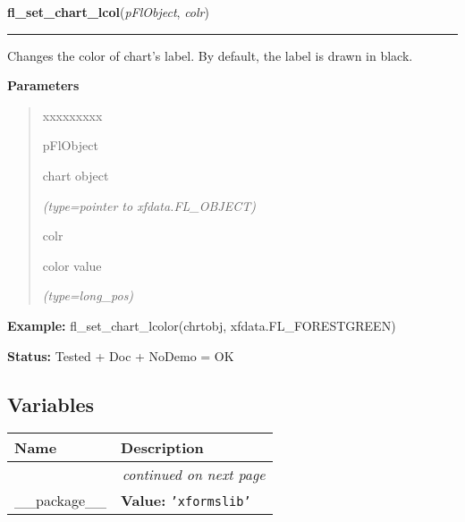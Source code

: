 \hspace{.8\funcindent}\begin{boxedminipage}{\funcwidth}

    \raggedright \textbf{fl\_set\_chart\_lcol}(\textit{pFlObject}, \textit{colr})

    \vspace{-1.5ex}

    \rule{\textwidth}{0.5\fboxrule}
\setlength{\parskip}{2ex}
    Changes the color of chart's label. By default, the label is drawn in 
    black.

\setlength{\parskip}{1ex}
      \textbf{Parameters}
      \vspace{-1ex}

      \begin{quote}
        \begin{Ventry}{xxxxxxxxx}

          \item[pFlObject]

          chart object

            {\it (type=pointer to xfdata.FL\_OBJECT)}

          \item[colr]

          color value

            {\it (type=long\_pos)}

        \end{Ventry}

      \end{quote}

\textbf{Example:} fl\_set\_chart\_lcolor(chrtobj, xfdata.FL\_FORESTGREEN)



\textbf{Status:} Tested + Doc + NoDemo = OK



    \end{boxedminipage}



  \subsection{Variables}

    \vspace{-1cm}
\hspace{\varindent}\begin{longtable}{|p{\varnamewidth}|p{\vardescrwidth}|l}
\cline{1-2}
\cline{1-2} \centering \textbf{Name} & \centering \textbf{Description}& \\
\cline{1-2}
\endhead\cline{1-2}\multicolumn{3}{r}{\small\textit{continued on next page}}\\\endfoot\cline{1-2}
\endlastfoot\raggedright \_\-\_\-p\-a\-c\-k\-a\-g\-e\-\_\-\_\- & \raggedright \textbf{Value:} 
{\tt \texttt{'}\texttt{xformslib}\texttt{'}}&\\
\cline{1-2}
\end{longtable}

